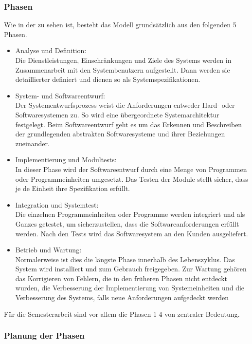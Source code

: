 \subsubsection{Phasen}
Wie in der  zu sehen ist, besteht das Modell grundsätzlich aus den folgenden 5 Phasen.
  \begin{itemize}
      \item Analyse und Definition:\\
      Die Dienstleistungen, Einschränkungen und Ziele des Systems werden in Zusammenarbeit mit den Systembenutzern aufgestellt. Dann werden sie detaillierter  definiert und dienen so als Systemspezifikationen. 
      \item System- und Softwareentwurf:\\  Der Systementwurfsprozess weist die Anforderungen entweder Hard- oder Softwaresystemen zu. So wird eine übergeordnete Systemarchitektur festgelegt. Beim Softwareentwurf geht es um das Erkennen und Beschreiben der grundlegenden abstrakten Softwaresysteme und ihrer Beziehungen zueinander. 
      \item Implementierung und Modultests:\\  In dieser Phase wird der Softwareentwurf durch eine Menge von Programmen oder Programmeinheiten umgesetzt. Das Testen der Module stellt sicher, dass je de Einheit ihre Spezifikation erfüllt.
      \item Integration und Systemtest:\\  Die einzelnen Programmeinheiten oder Programme werden integriert und als Ganzes getestet, um sicherzustellen, dass die Softwareanforderungen erfüllt werden. Nach den Tests wird das Softwaresystem an den Kunden ausgeliefert.
      \item Betrieb und Wartung:\\ Normalerweise ist dies die längste Phase innerhalb des Lebenszyklus. Das System wird installiert und zum Gebrauch freigegeben. Zur Wartung gehören das Korrigieren von Fehlern,  die in den früheren Phasen nicht entdeckt wurden, die Verbesserung der Implementierung von Systemeinheiten und die Verbesserung des Systems, falls neue Anforderungen aufgedeckt werden
  \end{itemize}

Für die Semesterarbeit sind vor allem die Phasen 1-4 von zentraler Bedeutung.

\subsubsection{Planung der Phasen}

